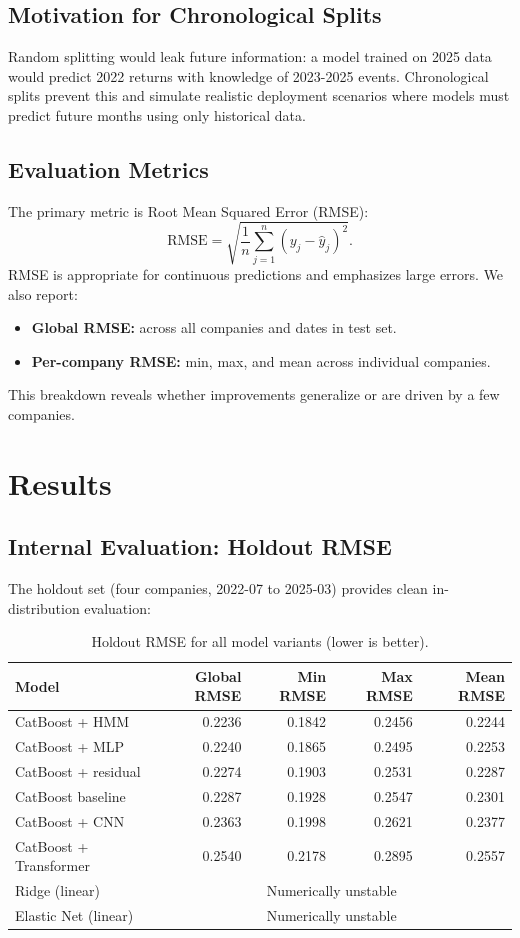 \documentclass[11pt]{article}
\begin{document}
\subsection{Motivation for Chronological Splits}
Random splitting would leak future information: a model trained on 2025 data would predict 2022 returns with knowledge of 2023-2025 events. Chronological splits prevent this and simulate realistic deployment scenarios where models must predict future months using only historical data.

\subsection{Evaluation Metrics}
The primary metric is Root Mean Squared Error (RMSE):
\begin{equation}
\mathrm{RMSE} = \sqrt{\frac{1}{n} \sum_{j=1}^{n}(y_j - \hat{y}_j)^2}.
\end{equation}
RMSE is appropriate for continuous predictions and emphasizes large errors. We also report:
\begin{itemize}[leftmargin=1.2em]
    \item \textbf{Global RMSE:} across all companies and dates in test set.
    \item \textbf{Per-company RMSE:} min, max, and mean across individual companies.
\end{itemize}
This breakdown reveals whether improvements generalize or are driven by a few companies.

\section{Results}

\subsection{Internal Evaluation: Holdout RMSE}
The holdout set (four companies, 2022-07 to 2025-03) provides clean in-distribution evaluation:

\begin{table}[H]
\centering
\caption{Holdout RMSE for all model variants (lower is better).}
\begin{tabular}{l r r r r}
\toprule
Model & Global RMSE & Min RMSE & Max RMSE & Mean RMSE \\
\midrule
CatBoost + HMM & 0.2236 & 0.1842 & 0.2456 & 0.2244 \\
CatBoost + MLP & 0.2240 & 0.1865 & 0.2495 & 0.2253 \\
CatBoost + residual & 0.2274 & 0.1903 & 0.2531 & 0.2287 \\
CatBoost baseline & 0.2287 & 0.1928 & 0.2547 & 0.2301 \\
CatBoost + CNN & 0.2363 & 0.1998 & 0.2621 & 0.2377 \\
CatBoost + Transformer & 0.2540 & 0.2178 & 0.2895 & 0.2557 \\
Ridge (linear) & \multicolumn{4}{c}{Numerically unstable} \\
Elastic Net (linear) & \multicolumn{4}{c}{Numerically unstable} \\
\bottomrule
\end{tabular}
\end{table}
\end{document}
